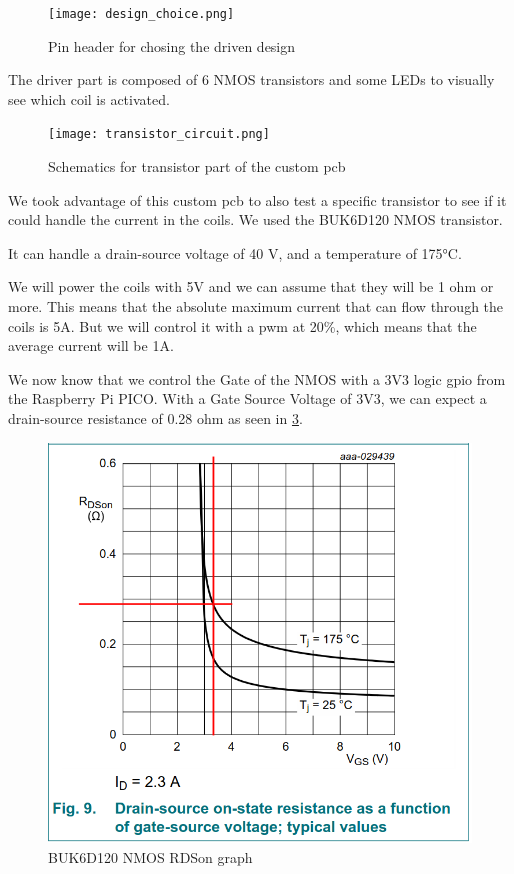 \begin{figure}[H]
	\centering
	\texttt{[image: design\_choice.png]}
	\caption[Pin header for chosing the driven design]{Pin header for chosing the driven design}
	\label{fig:deisgn_choice}
\end{figure}


The driver part is composed of 6 NMOS transistors and some LEDs to visually see which coil is activated.

\begin{figure}[H]
	\centering
	\texttt{[image: transistor\_circuit.png]}
	\caption[Schematics for transistor part of the custom \gls{pcb}]{Schematics for transistor part of the custom \gls{pcb}}
	\label{fig:transistor_circuit}
\end{figure}

We took advantage of this custom \gls{pcb} to also test a specific transistor to see if it could handle the current in the coils. We used the BUK6D120 NMOS transistor.

It can handle a drain-source voltage of 40 V, and a temperature of 175°C.

We will power the coils with 5V and we can assume that they will be 1 ohm or more. This means that the absolute maximum current that can flow through the coils is 5A. But we will control it with a \gls{pwm} at 20\%, which means that the average current will be 1A.


We now know that we control the Gate of the NMOS with a 3V3 logic \gls{gpio} from the Raspberry Pi PICO. With a Gate Source Voltage of 3V3, we can expect a drain-source resistance of 0.28 ohm as seen in \ref{fig:transistor_rdson}.

\begin{figure}[H]
	\centering
	\includegraphics[width=0.7\linewidth]{transistor_rdson.png}
	\caption[BUK6D120 NMOS RDSon graph]{BUK6D120 NMOS RDSon graph}
	\label{fig:transistor_rdson}
\end{figure}

